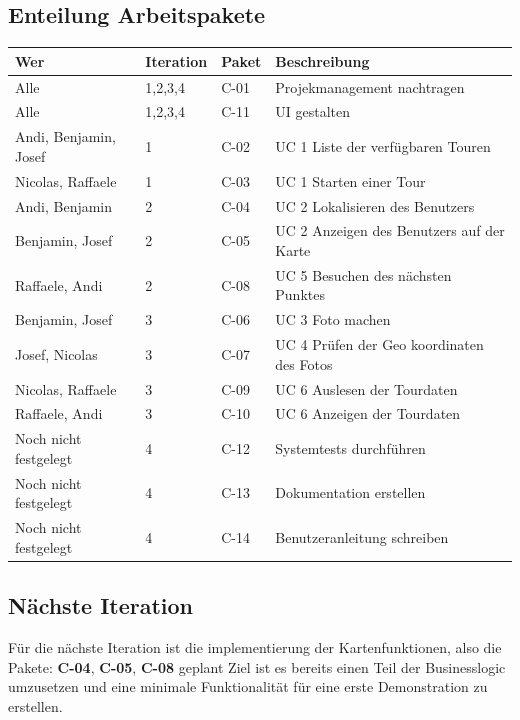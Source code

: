 \documentclass[a4paper,10pt,xetex]{article}
\begin{document}
\subsection{Enteilung Arbeitspakete}\label{enteilung-arbeitspakete}
\begin{longtabu} to \textwidth { | l | l | l | X[l] | }
\hline
\textbf{Wer} & \textbf{Iteration} & \textbf{Paket} & \textbf{Beschreibung} \\\hline
\endhead

Alle                         & 1,2,3,4 & C-01 & Projekmanagement nachtragen \\\hline
Alle                         & 1,2,3,4 & C-11 & UI gestalten \\\hline
Andi, Benjamin, Josef        & 1       & C-02 & UC 1 Liste der verfügbaren Touren \\\hline
Nicolas, Raffaele            & 1       & C-03 & UC 1 Starten einer Tour \\\hline
Andi, Benjamin               & 2       & C-04 & UC 2 Lokalisieren des Benutzers \\\hline
Benjamin, Josef              & 2       & C-05 & UC 2 Anzeigen des Benutzers auf der Karte \\\hline
Raffaele, Andi               & 2       & C-08 & UC 5 Besuchen des nächsten Punktes \\\hline
Benjamin, Josef              & 3       & C-06 & UC 3 Foto machen \\\hline
Josef, Nicolas               & 3       & C-07 & UC 4 Prüfen der Geo koordinaten des Fotos \\\hline
Nicolas, Raffaele            & 3       & C-09 & UC 6 Auslesen der Tourdaten \\\hline
Raffaele, Andi               & 3       & C-10 & UC 6 Anzeigen der Tourdaten \\\hline
Noch nicht festgelegt        & 4       & C-12 & Systemtests durchführen \\\hline
Noch nicht festgelegt        & 4       & C-13 & Dokumentation erstellen \\\hline
Noch nicht festgelegt        & 4       & C-14 & Benutzeranleitung schreiben \\\hline
\end{longtabu}


\subsection{Nächste Iteration}\label{naechste-iteration}
Für die nächste Iteration ist die implementierung der Kartenfunktionen, also die Pakete: \textbf{C-04}, \textbf{C-05}, \textbf{C-08} geplant
Ziel ist es bereits einen Teil der Businesslogic umzusetzen und eine minimale Funktionalität für eine erste Demonstration zu erstellen.
\end{document}
